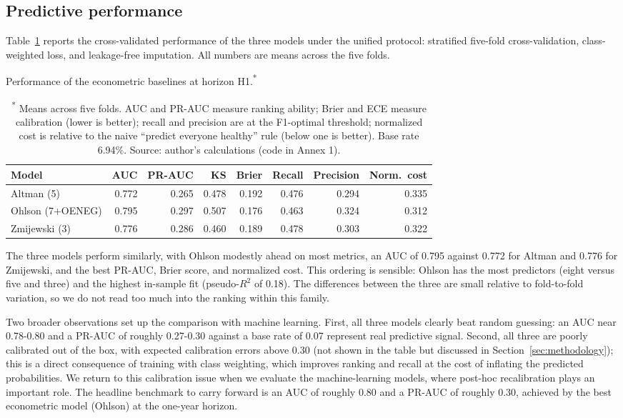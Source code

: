 \documentclass[12pt,a4paper]{article}
\begin{document}
\subsection{Predictive performance}

Table~\ref{tab:econ-cv} reports the cross-validated performance of the three
models under the unified protocol: stratified five-fold cross-validation,
class-weighted loss, and leakage-free imputation. All numbers are means across
the five folds.

\begin{table}[ht]
\centering
\caption{Performance of the econometric baselines at horizon H1.\textsuperscript{*}}
\label{tab:econ-cv}
\small
\begin{tabular}{lrrrrrrr}
\toprule
Model & AUC & PR-AUC & KS & Brier & Recall & Precision & Norm.\ cost \\
\midrule
Altman (5)        & 0.772 & 0.265 & 0.478 & 0.192 & 0.476 & 0.294 & 0.335 \\
Ohlson (7+OENEG)  & 0.795 & 0.297 & 0.507 & 0.176 & 0.463 & 0.324 & 0.312 \\
Zmijewski (3)     & 0.776 & 0.286 & 0.460 & 0.189 & 0.478 & 0.303 & 0.322 \\
\bottomrule
\end{tabular}
\caption*{\footnotesize \textsuperscript{*} Means across five folds. AUC and PR-AUC measure ranking ability; Brier and ECE measure calibration (lower is better); recall and precision are at the F1-optimal threshold; normalized cost is relative to the naive ``predict everyone healthy'' rule (below one is better). Base rate 6.94\%. Source: author's calculations (code in Annex 1).}
\end{table}

The three models perform similarly, with Ohlson modestly ahead on most
metrics, an AUC of 0.795 against 0.772 for Altman and 0.776 for Zmijewski,
and the best PR-AUC, Brier score, and normalized cost. This ordering is
sensible: Ohlson has the most predictors (eight versus five and three) and the
highest in-sample fit (pseudo-$R^2$ of 0.18). The differences between the three are small relative to fold-to-fold
variation, so we do not read too much into the ranking within this family.

Two broader observations set up the comparison with machine learning. First,
all three models clearly beat random guessing: an AUC near 0.78-0.80 and a
PR-AUC of roughly 0.27-0.30 against a base rate of 0.07 represent real
predictive signal. Second, all three are poorly calibrated out of the box, with
expected calibration errors above 0.30 (not shown in the table but discussed
in Section~\ref{sec:methodology}); this is a direct consequence of training
with class weighting, which improves ranking and recall at the cost of
inflating the predicted probabilities. We return to this calibration issue
when we evaluate the machine-learning models, where post-hoc recalibration
plays an important role. The headline benchmark to carry forward is an AUC of
roughly 0.80 and a PR-AUC of roughly 0.30, achieved by the best econometric
model (Ohlson) at the one-year horizon.
\end{document}
